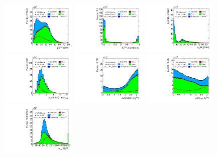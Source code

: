 \begin{figure}[tp]
  \centering
  \includegraphics[width=0.32\textwidth]{figures/presel/met-pt}
  \includegraphics[width=0.32\textwidth]{figures/presel/met-phi-centrality}
  \includegraphics[width=0.32\textwidth]{figures/presel/H-pt}
  \includegraphics[width=0.32\textwidth]{figures/presel/taulep-ptratio}
  \includegraphics[width=0.32\textwidth]{figures/presel/lepmet-dphi}
  \includegraphics[width=0.32\textwidth]{figures/presel/taumet-dphi}
  \includegraphics[width=0.32\textwidth]{figures/presel/mvis}

\end{figure}
